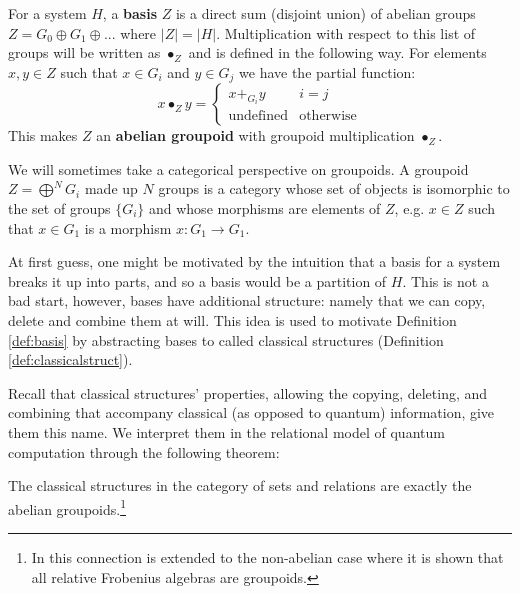 \begin{defn}
\label{def:basis}
For a system $H$, a \textbf{basis} $Z$ is a direct sum (disjoint union) of abelian groups $Z = G_0\oplus G_1\oplus...$ where $|Z| = |H|$.
Multiplication with respect to this list of groups will be written as $\bullet_Z$ and is defined in the following way. For elements $x,y\in Z$ such that $x\in G_i$ and $y\in G_j$ we have the partial function:
\begin{equation}
\label{eq:groupoidmult}
x\bullet_Zy = \begin{cases}
x +_{G_i} y & i=j \\
\mbox{undefined} & \mbox{otherwise}
\end{cases}
\end{equation}
This makes $Z$ an \textbf{abelian groupoid} with groupoid multiplication $\bullet_Z$.
\end{defn}
We will sometimes take a categorical perspective on groupoids. A groupoid $Z=\bigoplus^NG_i$ made up $N$ groups is a category whose set of objects is isomorphic to the set of groups $\{G_i\}$ and whose morphisms are elements of $Z$, e.g. $x\in Z$ such that $x\in G_1$ is a morphism $x:G_1\to G_1$.

At first guess, one might be motivated by the intuition that a basis for a system breaks it up into parts, and so a basis would be a partition of $H$.  This is not a bad start, however, bases have additional structure: namely that we can copy, delete and combine them at will.  This idea is used to motivate Definition \ref{def:basis} by abstracting bases to called classical structures (Definition \ref{def:classicalstruct}).

Recall that classical structures' properties, allowing the copying, deleting, and combining that accompany classical (as opposed to quantum) information, give them this name. We interpret them in the relational model of quantum computation through the following theorem:

\begin{lemma}
\label{lem:sdfa-rel}
The classical structures in the category of sets and relations are exactly the abelian groupoids.\footnote{In \cite{heunen-relFrob} this connection is extended to the non-abelian case where it is shown that all relative Frobenius algebras are groupoids.}
\end{lemma}

